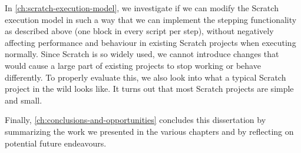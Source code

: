 \documentclass[main]{subfiles}
\begin{document}
In \cref{ch:scratch-execution-model}, we investigate if we can modify the Scratch execution model in such a way that we can implement the stepping functionality as described above (one block in every script per step), without negatively affecting performance and behaviour in existing Scratch projects when executing normally.
Since Scratch is so widely used, we cannot introduce changes that would cause a large part of existing projects to stop working or behave differently.
To properly evaluate this, we also look into what a typical Scratch project in the wild looks like.
It turns out that most Scratch projects are simple and small.

Finally, \cref{ch:conclusions-and-opportunities} concludes this dissertation by summarizing the work we presented in the various chapters and by reflecting on potential future endeavours.
\end{document}
